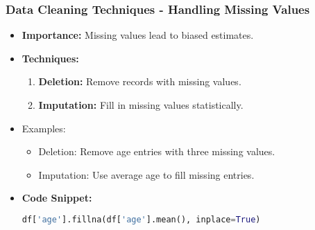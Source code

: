 \documentclass[aspectratio=169]{beamer}
\begin{document}
\begin{frame}[fragile]
    \frametitle{Data Cleaning Techniques - Handling Missing Values}
    \begin{itemize}
        \item \textbf{Importance:} Missing values lead to biased estimates.
        \item \textbf{Techniques:}
            \begin{enumerate}
                \item \textbf{Deletion:} Remove records with missing values.
                \item \textbf{Imputation:} Fill in missing values statistically.
            \end{enumerate}
            \item Examples:
            \begin{itemize}
                \item Deletion: Remove age entries with three missing values.
                \item Imputation: Use average age to fill missing entries.
            \end{itemize}
            \item \textbf{Code Snippet:}
            \begin{lstlisting}[language=Python]
df['age'].fillna(df['age'].mean(), inplace=True)
            \end{lstlisting}
    \end{itemize}    
\end{frame}
\end{document}
